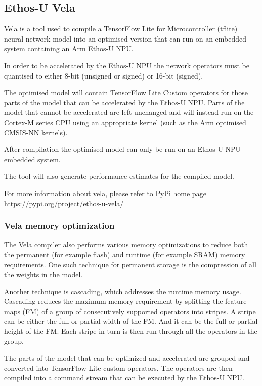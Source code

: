\subsection{Ethos-U Vela}\label{sub:vela}
Vela is a tool used to compile a TensorFlow Lite for Microcontroller (tflite)
neural network model into an optimised version that can run on an embedded
system containing an Arm Ethos-U NPU\@.

In order to be accelerated by the Ethos-U NPU the network operators must be
quantised to either 8-bit (unsigned or signed) or 16-bit (signed).

The optimised model will contain TensorFlow Lite Custom operators for those
parts of the model that can be accelerated by the Ethos-U NPU\@. Parts of the
model that cannot be accelerated are left unchanged and will instead run on the
Cortex-M series CPU using an appropriate kernel (such as the Arm optimised
CMSIS-NN kernels).

After compilation the optimised model can only be run on an Ethos-U NPU
embedded system.

The tool will also generate performance estimates for the compiled model.

For more information about vela, please refer to PyPi home page
\url{https://pypi.org/project/ethos-u-vela/}

\subsubsection{Vela memory optimization}\label{subsub:vela_memory_optimization}
The Vela compiler also performs various memory optimizations to reduce both the
permanent (for example flash) and runtime (for example SRAM) memory
requirements.
One such technique for permanent storage is the compression of all the weights
in the model.

Another technique is cascading, which addresses the runtime memory usage.
Cascading reduces the maximum memory requirement by splitting the feature maps
(FM) of a group of consecutively supported operators into stripes. A stripe can
be either the full or partial width of the FM\@. And it can be the full or
partial height of the FM\@. Each stripe in turn is then run through all the
operators in the group.

The parts of the model that can be optimized and accelerated are grouped and
converted into TensorFlow Lite custom operators. The operators are then
compiled into a command stream that can be executed by the Ethos-U NPU\@.

